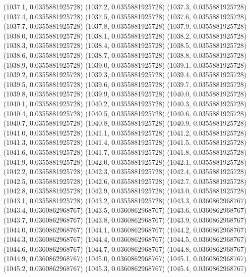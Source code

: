 {					(1037.1, 0.0355881925728)
					(1037.2, 0.0355881925728)
					(1037.3, 0.0355881925728)
					(1037.4, 0.0355881925728)
					(1037.5, 0.0355881925728)
					(1037.6, 0.0355881925728)
					(1037.7, 0.0355881925728)
					(1037.8, 0.0355881925728)
					(1037.9, 0.0355881925728)
					(1038.0, 0.0355881925728)
					(1038.1, 0.0355881925728)
					(1038.2, 0.0355881925728)
					(1038.3, 0.0355881925728)
					(1038.4, 0.0355881925728)
					(1038.5, 0.0355881925728)
					(1038.6, 0.0355881925728)
					(1038.7, 0.0355881925728)
					(1038.8, 0.0355881925728)
					(1038.9, 0.0355881925728)
					(1039.0, 0.0355881925728)
					(1039.1, 0.0355881925728)
					(1039.2, 0.0355881925728)
					(1039.3, 0.0355881925728)
					(1039.4, 0.0355881925728)
					(1039.5, 0.0355881925728)
					(1039.6, 0.0355881925728)
					(1039.7, 0.0355881925728)
					(1039.8, 0.0355881925728)
					(1039.9, 0.0355881925728)
					(1040.0, 0.0355881925728)
					(1040.1, 0.0355881925728)
					(1040.2, 0.0355881925728)
					(1040.3, 0.0355881925728)
					(1040.4, 0.0355881925728)
					(1040.5, 0.0355881925728)
					(1040.6, 0.0355881925728)
					(1040.7, 0.0355881925728)
					(1040.8, 0.0355881925728)
					(1040.9, 0.0355881925728)
					(1041.0, 0.0355881925728)
					(1041.1, 0.0355881925728)
					(1041.2, 0.0355881925728)
					(1041.3, 0.0355881925728)
					(1041.4, 0.0355881925728)
					(1041.5, 0.0355881925728)
					(1041.6, 0.0355881925728)
					(1041.7, 0.0355881925728)
					(1041.8, 0.0355881925728)
					(1041.9, 0.0355881925728)
					(1042.0, 0.0355881925728)
					(1042.1, 0.0355881925728)
					(1042.2, 0.0355881925728)
					(1042.3, 0.0355881925728)
					(1042.4, 0.0355881925728)
					(1042.5, 0.0355881925728)
					(1042.6, 0.0355881925728)
					(1042.7, 0.0355881925728)
					(1042.8, 0.0355881925728)
					(1042.9, 0.0355881925728)
					(1043.0, 0.0355881925728)
					(1043.1, 0.0355881925728)
					(1043.2, 0.0355881925728)
					(1043.3, 0.0360862968767)
					(1043.4, 0.0360862968767)
					(1043.5, 0.0360862968767)
					(1043.6, 0.0360862968767)
					(1043.7, 0.0360862968767)
					(1043.8, 0.0360862968767)
					(1043.9, 0.0360862968767)
					(1044.0, 0.0360862968767)
					(1044.1, 0.0360862968767)
					(1044.2, 0.0360862968767)
					(1044.3, 0.0360862968767)
					(1044.4, 0.0360862968767)
					(1044.5, 0.0360862968767)
					(1044.6, 0.0360862968767)
					(1044.7, 0.0360862968767)
					(1044.8, 0.0360862968767)
					(1044.9, 0.0360862968767)
					(1045.0, 0.0360862968767)
					(1045.1, 0.0360862968767)
					(1045.2, 0.0360862968767)
					(1045.3, 0.0360862968767)
					(1045.4, 0.0360862968767)
}
